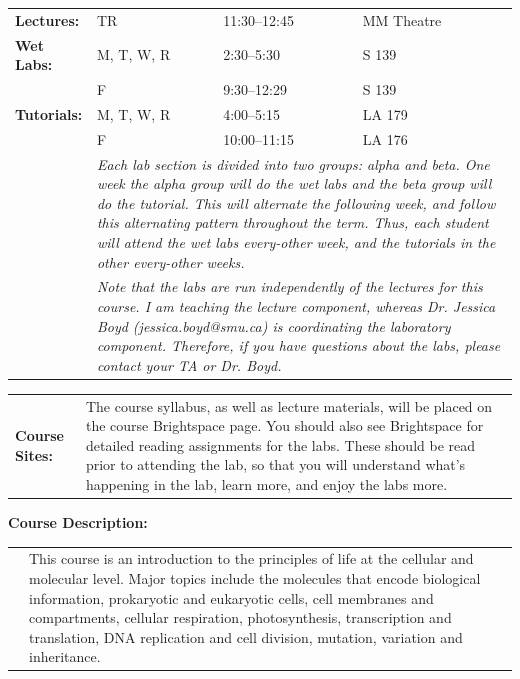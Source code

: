 \documentclass[hidelinks]{article}
\begin{document}
	\begin{tabular}{@{} p{2.3cm} l l l}
		\textbf{Lectures:} & TR & 11:30--12:45 & MM Theatre\\
		\addlinespace
		\textbf{Wet Labs:} 	& M, T, W, R & 2:30--5:30 & S 139\\
							& F & 9:30--12:29 & S 139\\
		\addlinespace
		\textbf{Tutorials:}	& M, T, W, R & 4:00--5:15 & LA 179\\
							& F & 10:00--11:15 & LA 176\\
		\addlinespace
			& \multicolumn{3}{p{14cm}}{\emph{Each lab section is divided into two groups: alpha and beta. One week the alpha group will do the wet labs and the beta group will do the tutorial. This will alternate the following week, and follow this alternating pattern throughout the term. Thus, each student will attend the wet labs every-other week, and the tutorials in the other every-other weeks.}}\\
		\addlinespace						
			& \multicolumn{3}{p{14cm}}{\emph{Note that the labs are run independently of the lectures for this course. I am teaching the lecture component, whereas Dr. Jessica Boyd (jessica.boyd@smu.ca) is coordinating the laboratory component. Therefore, if you have questions about the labs, please contact your TA or Dr. Boyd.}}
	\end{tabular}
	
	
	\begin{tabular}{@{} p{2.3cm} p{13.9cm}}
		\textbf{Course Sites:} & The course syllabus, as well as lecture materials, will be placed on the course Brightspace page. You should also see Brightspace for detailed reading assignments for the labs. These should be read prior to attending the lab, so that you will understand what's happening in the lab, learn more, and enjoy the labs more.\\
	\end{tabular}


	\textbf{Course Description:}\\
	\begin{tabular}{@{} p{2.3cm} p{13.9cm}}
		 & This course is an introduction to the principles of life at the cellular and molecular level. Major topics include the molecules that encode biological information, prokaryotic and eukaryotic cells, cell membranes and compartments, cellular respiration, photosynthesis, transcription and translation, DNA replication and cell division, mutation, variation and inheritance.
	\end{tabular}
\end{document}
